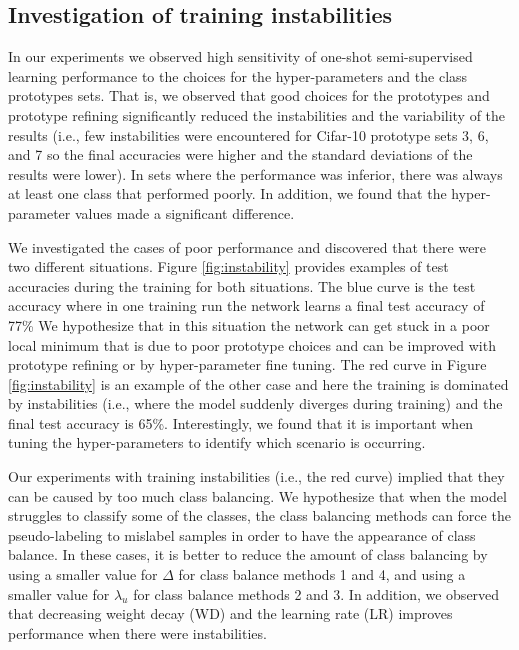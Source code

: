\documentclass[final]{cvpr}
\newcommand{\OSSSL}{one-shot semi-supervised learning }
\newcommand{\HP}{hyper-parameter }
\newcommand{\HPs}{hyper-parameters }
\begin{document}
\subsection{Investigation of training instabilities}
\label{sec:expHPsensitivity}

In our experiments we observed high sensitivity of \OSSSL performance to the choices for the hyper-parameters and the class prototypes sets.
That is, we observed that good choices for the prototypes and prototype refining significantly reduced the instabilities and the variability of the results (i.e., few instabilities were encountered for Cifar-10 prototype sets 3, 6, and 7 so the final accuracies were higher and the standard deviations of the results were lower).
In sets where the performance was inferior, there was always at least one class that performed poorly.
In addition, we found that the \HP values made a significant difference.




We investigated the cases of poor performance and discovered that there were two different situations.
Figure \ref{fig:instability} provides examples of test accuracies during the training for both situations.
The blue curve is the test accuracy where in one training run the network learns a final test accuracy of 77\% 
We hypothesize that in this situation the network can get stuck in a poor local minimum that is due to poor prototype choices and can be improved with prototype refining or by \HP fine tuning.
The red curve in Figure \ref{fig:instability} is an example of the other case and here the training is dominated by instabilities (i.e., where the model suddenly diverges during training) and the final test accuracy is 65\%.
Interestingly, we found that it is important when tuning the \HPs to identify which scenario is occurring.


Our experiments with training instabilities (i.e., the red curve) implied that they can be caused by too much class balancing.
We hypothesize that when the model struggles to classify some of the classes, the class balancing methods can force the pseudo-labeling to mislabel samples in order to have the appearance of class balance.
In these cases, it is better to reduce the amount of class balancing by using a smaller value for $ \Delta $ for class balance methods 1 and 4, and using a smaller value for $ \lambda_u $ for class balance methods 2 and 3.
In addition, we observed that decreasing weight decay (WD) and the learning rate (LR) improves performance when there were instabilities.
\end{document}
